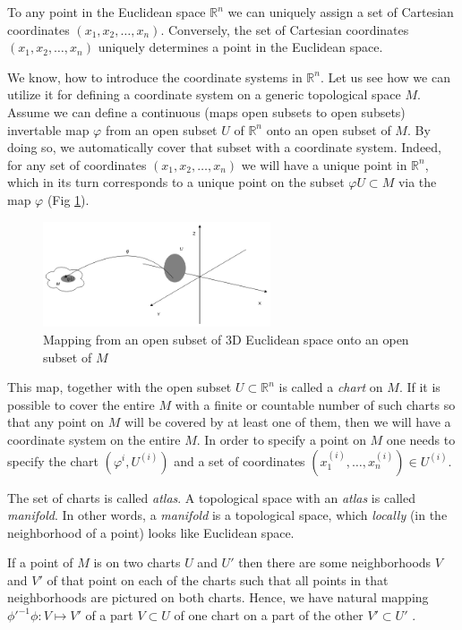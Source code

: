\documentclass[a4paper,10pt]{article}
\begin{document}
To any point in the Euclidean space $\mathbb{R}^n$  we can uniquely assign a set of Cartesian coordinates $(x_1, x_2,\ldots, x_n)$. Conversely, the set of Cartesian coordinates $(x_1, x_2,\ldots, x_n)$ uniquely determines a point in the Euclidean space. 

We know, how to introduce the coordinate systems in $\mathbb{R}^n$. Let us see how we can utilize it for defining a coordinate system on a generic topological space $M$. Assume we can define a continuous (maps open subsets to open subsets) invertable map $\varphi$ from an open subset $U$ of $\mathbb{R}^n$ onto an open subset of $M$. By doing so, we automatically cover that subset with a coordinate system. Indeed, for any set of coordinates $(x_1, x_2,\ldots, x_n)$ we will have a unique point in $\mathbb{R}^n$, which in its turn corresponds to a unique point on the subset $\varphi U \subset M$ via the map $\varphi$ (Fig \ref{fig:phimap}). 

\begin{figure}[h]
\centering
 \includegraphics[width=0.6\textwidth]{../../images/PhiMap.png}
 \caption{Mapping from an open subset of 3D Euclidean space onto an open subset of $M$}
 \label{fig:phimap}
\end{figure}

This map, together with the open subset $U\subset \mathbb{R}^n$ is called a {\it chart} on $M$. If it is possible to cover the entire $M$ with a finite or countable number of such charts so that any point on $M$ will be covered by at least one of them, then we will have a coordinate system on the entire $M$. In order to specify a point on $M$ one needs to specify the chart $(\varphi^i, U^{(i)})$ and a set of coordinates $(x_1^{(i)}, \ldots, x_n^{(i)})\in U^{(i)}$. 

The set of charts is called {\it atlas}. A topological space with an {\it atlas} is called {\it manifold}. 
In other words, a {\it manifold} is a topological space, which { \it locally } (in the neighborhood of a point) looks like Euclidean space. 

If a point of $M$ is on two charts $U$ and $U'$ then there are some neighborhoods $V$ and $V'$ of that point on each of the charts such that all points in that neighborhoods are pictured on both charts. Hence, we have natural mapping $\phi'^{-1}\phi: V\mapsto V'$ of a part $V\subset U$ of one chart on a part of the other $V'\subset U'$ \cite{arn, egh}.
\end{document}
